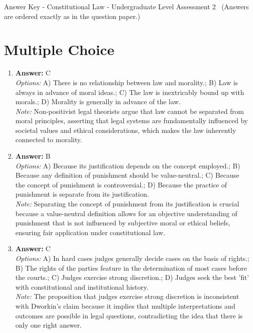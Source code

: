 \documentclass[12pt]{article}
\begin{document}
\begin{center}
Answer Key - Constitutional Law - Undergraduate Level Assessment 2 \
\small (Answers are ordered exactly as in the question paper.)
\end{center}

\section*{Multiple Choice}
\begin{enumerate}[label=\arabic*.]
\item \textbf{Answer:} C
\\ \textit{Options:} A) There is no relationship between law and morality.; B) Law is always in advance of moral ideas.; C) The law is inextricably bound up with morals.; D) Morality is generally in advance of the law.
\\ \textit{Note:} Non-positivist legal theorists argue that law cannot be separated from moral principles, asserting that legal systems are fundamentally influenced by societal values and ethical considerations, which makes the law inherently connected to morality.
\item \textbf{Answer:} B
\\ \textit{Options:} A) Because its justification depends on the concept employed.; B) Because any definition of punishment should be value-neutral.; C) Because the concept of punishment is controversial.; D) Because the practice of punishment is separate from its justification.
\\ \textit{Note:} Separating the concept of punishment from its justification is crucial because a value-neutral definition allows for an objective understanding of punishment that is not influenced by subjective moral or ethical beliefs, ensuring fair application under constitutional law.
\item \textbf{Answer:} C
\\ \textit{Options:} A) In hard cases judges generally decide cases on the basis of rights.; B) The rights of the parties feature in the determination of most cases before the courts.; C) Judges exercise strong discretion.; D) Judges seek the best 'fit' with constitutional and institutional history.
\\ \textit{Note:} The proposition that judges exercise strong discretion is inconsistent with Dworkin's claim because it implies that multiple interpretations and outcomes are possible in legal questions, contradicting the idea that there is only one right answer.

\end{enumerate}
\end{document}
